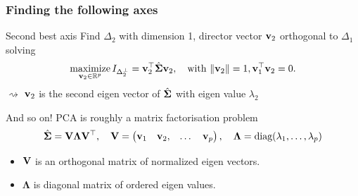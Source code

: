 \documentclass{beamer}\usepackage[]{graphicx}\usepackage[]{color}
\begin{document}
\begin{frame}
  \frametitle{Finding the following axes}

  \begin{block}{Second best axis}
    Find $\Delta_2$ with dimension 1, director vector $\mathbf{v}_2$ orthogonal to $\Delta_1$ solving
    \begin{equation*}
        \mathop{\mathrm{maximize}}_{\mathbf{v}_2 \in \mathbb{R}^p} I_{\Delta_2^\bot} = \mathbf{v}_2^\top \hat{\boldsymbol{\Sigma}}\mathbf{v}_2, \quad \text{with } \|\mathbf{v}_2\| = 1, \mathbf{v}_1^\top \mathbf{v}_2 = 0.
    \end{equation*} 
  $\rightsquigarrow$ $\mathbf{v}_2$ is the second eigen vector of $\hat{\boldsymbol{\Sigma}}$ with eigen value $\lambda_2$
  \end{block}
  
  \vfill
  \pause
  
  \begin{block}{And so on!}
    PCA is roughly a matrix factorisation problem 
    \begin{equation*}
      \hat{\boldsymbol{\Sigma}} = \mathbf{V} \boldsymbol\Lambda \mathbf{V}^\top, \quad
      \mathbf{V} = \begin{pmatrix}
      \mathbf{v}_1 & \mathbf{v}_2, & \dots & \mathbf{v}_p
      \end{pmatrix}, \quad \boldsymbol\Lambda = \text{diag}(\lambda_1, \dots, \lambda_p)
    \end{equation*}
    \hspace{-.5cm}
  \begin{itemize}
    \item $\mathbf{V}$ is an orthogonal matrix of normalized eigen vectors.
    \item $\boldsymbol\Lambda$ is diagonal matrix of  ordered eigen values.
  \end{itemize}
  \end{block}
\end{frame}
\end{document}

